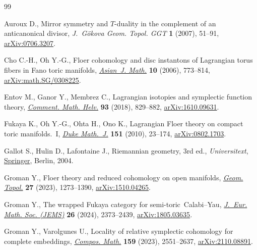 \begin{thebibliography}{99}
\footnotesize\itemsep=0pt

Auroux D., Mirror symmetry and {$T$}-duality in the complement of an
 anticanonical divisor, \textit{J.~G\"okova Geom. Topol. GGT} \textbf{1}
 (2007), 51--91, \href{http://arxiv.org/abs/0706.3207}{arXiv:0706.3207}.

Cho C.-H., Oh Y.-G., Floer cohomology and disc instantons of {L}agrangian torus
 fibers in {F}ano toric manifolds,
 \href{https://doi.org/10.4310/AJM.2006.v10.n4.a10}{\textit{Asian~J. Math.}}
 \textbf{10} (2006), 773--814,
 \href{http://arxiv.org/abs/math.SG/0308225}{arXiv:math.SG/0308225}.

Entov M., Ganor Y., Membrez C., Lagrangian isotopies and symplectic function
 theory, \href{https://doi.org/10.4171/CMH/451}{\textit{Comment. Math. Helv.}}
 \textbf{93} (2018), 829--882,
 \href{http://arxiv.org/abs/1610.09631}{arXiv:1610.09631}.

Fukaya K., Oh Y.-G., Ohta H., Ono K., Lagrangian {F}loer theory on compact toric
 manifolds.~{I}, \href{https://doi.org/10.1215/00127094-2009-062}{\textit{Duke
 Math.~J.}} \textbf{151} (2010), 23--174,
 \href{http://arxiv.org/abs/0802.1703}{arXiv:0802.1703}.

Gallot S., Hulin D., Lafontaine J., Riemannian geometry, 3rd ed., \textit{Universitext},
 \href{https://doi.org/10.1007/978-3-642-18855-8}{Springer}, Berlin, 2004.

Groman Y., Floer theory and reduced cohomology on open manifolds,
 \href{https://doi.org/10.2140/gt.2023.27.1273}{\textit{Geom. Topol.}}
 \textbf{27} (2023), 1273--1390,
 \href{http://arxiv.org/abs/1510.04265}{arXiv:1510.04265}.

Groman Y., The wrapped {F}ukaya category for semi-toric~{C}alabi--{Y}au,
 \href{https://doi.org/10.4171/jems/1466}{\textit{J.~Eur. Math. Soc. (JEMS)}}
 \textbf{26} (2024), 2373--2439,
 \href{http://arxiv.org/abs/1805.03635}{arXiv:1805.03635}.

Groman Y., Varolgunes U., Locality of relative symplectic cohomology for
 complete embeddings,
 \href{https://doi.org/10.1112/s0010437x23007492}{\textit{Compos. Math.}}
 \textbf{159} (2023), 2551--2637,
 \href{http://arxiv.org/abs/2110.08891}{arXiv:2110.08891}.


\end{thebibliography}
